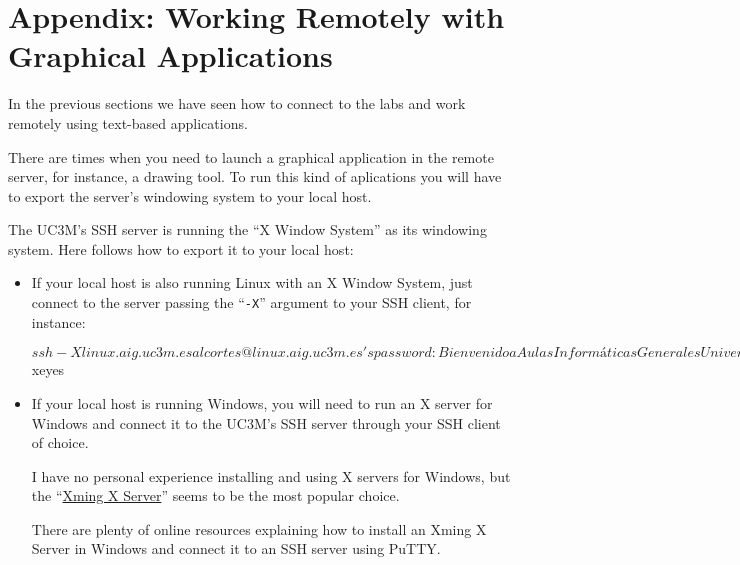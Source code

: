\documentclass[a4paper, 12pt]{article}
\begin{document}
\section{Appendix: Working Remotely with Graphical Applications}

In the previous sections we have seen how to connect to the labs and work
remotely using text-based applications.

There are times when you need to launch a graphical application in the remote
server, for instance, a drawing tool. To run this kind of aplications
you will have to export the server's windowing system to your local host.

The UC3M's SSH server is running the ``X Window System'' as its windowing
system.  Here follows how to export it to your local host:

\begin{itemize}

  \item If your local host is also running Linux with an X Window System, just
    connect to the server passing the ``\texttt{-X}'' argument to your SSH
    client, for instance:

    \begin{blackboard}
$ ssh -X linux.aig.uc3m.es
alcortes@linux.aig.uc3m.es's password: 

       Bienvenido a Aulas Informáticas Generales
          Universidad Carlos III de Madrid

          Puede contactar con nosotros en:
     
                gsai@aig.uc3m.es

Last login: Mon Jan 19 12:05:31 2015 from bat.it.uc3m.es
alcortes@linux:~$ xeyes 
\end{blackboard}

  \item If your local host is running Windows, you will need to run an X server
    for Windows and connect it to the UC3M's SSH server through your SSH client
    of choice.

    I have no personal experience installing and using X servers for Windows,
    but the ``\href{http://www.straightrunning.com/XmingNotes/}{Xming X
    Server}'' seems to be the most popular choice.

    There are plenty of online resources explaining how to install an Xming X
    Server in Windows and connect it to an SSH server using PuTTY.

\end{itemize}
\end{document}
